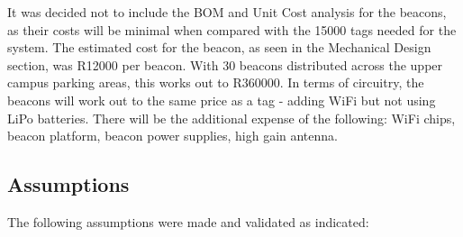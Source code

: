 It was decided not to include the BOM and Unit Cost analysis for the beacons, as their costs will be minimal when compared with the 15000 tags needed for the system. The estimated cost for the beacon, as seen in the Mechanical Design section, was R12000 per beacon. With 30 beacons distributed across the upper campus parking areas, this works out to R360000. In terms of circuitry, the beacons will work out to the same price as a tag - adding WiFi but not using LiPo batteries. There will be the additional expense of the following: WiFi chips, beacon platform, beacon power supplies, high gain antenna. 

\newpage
\subsection{Assumptions}
The following assumptions were made and validated as indicated:

